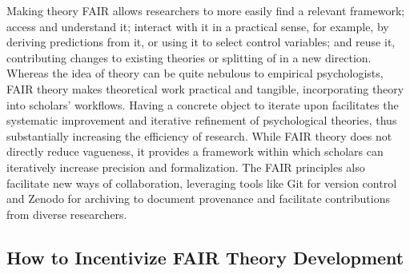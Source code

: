 \documentclass[
  man, noextraspace,floatsintext]{apa7}
\begin{document}
Making theory FAIR allows researchers to more easily find a relevant framework;
access and understand it; interact with it in a practical sense, for example, by deriving predictions from it, or using it to select control variables; and reuse it, contributing changes to existing theories or splitting of in a new direction.
Whereas the idea of theory can be quite nebulous to empirical psychologists,
FAIR theory makes theoretical work practical and tangible, incorporating theory into scholars' workflows.
Having a concrete object to iterate upon facilitates the systematic improvement and iterative refinement of psychological theories, thus substantially increasing the efficiency of research.
While FAIR theory does not directly reduce vagueness,
it provides a framework within which scholars can iteratively increase precision and formalization.
The FAIR principles also facilitate new ways of collaboration,
leveraging tools like Git for version control and Zenodo for archiving to document provenance and facilitate contributions from diverse researchers.

\subsection{How to Incentivize FAIR Theory Development}\label{how-to-incentivize-fair-theory-development}
\end{document}
